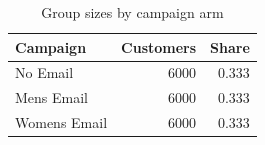\begin{table}

\caption{\label{tab:groupsizes}Group sizes by campaign arm}
\centering
\begin{tabular}[t]{lrr}
\toprule
Campaign & Customers & Share\\
\midrule
No Email & 6000 & 0.333\\
Mens Email & 6000 & 0.333\\
Womens Email & 6000 & 0.333\\
\bottomrule
\end{tabular}
\end{table}

